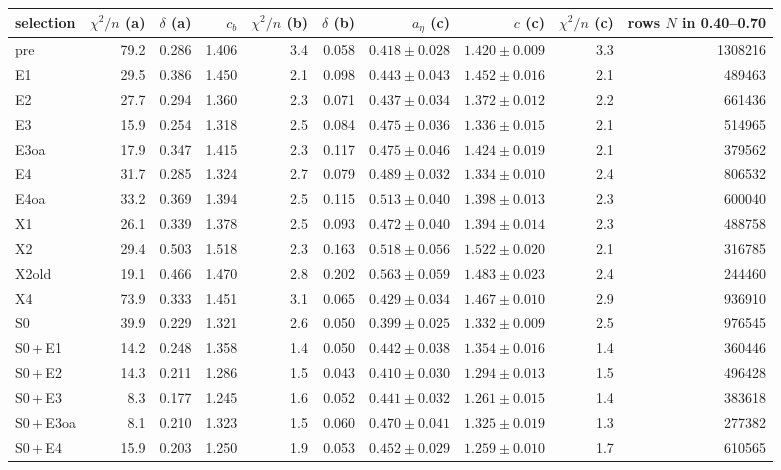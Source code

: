 \begin{tabular}{@{}l r r r r r r r r r@{}}
\toprule
selection & $\chi^2/n$ (a) & $\delta$ (a) & $c_b$ & $\chi^2/n$ (b) & $\delta$ (b) & $a_\eta$ (c) & $c$ (c) & $\chi^2/n$ (c) & rows $N$ in 0.40--0.70 \\
\midrule
pre & 79.2 & 0.286 & 1.406 & 3.4 & 0.058 & $0.418\pm0.028$ & $1.420\pm0.009$ & 3.3 & 1308216 \\
E1 & 29.5 & 0.386 & 1.450 & 2.1 & 0.098 & $0.443\pm0.043$ & $1.452\pm0.016$ & 2.1 & 489463 \\
E2 & 27.7 & 0.294 & 1.360 & 2.3 & 0.071 & $0.437\pm0.034$ & $1.372\pm0.012$ & 2.2 & 661436 \\
E3 & 15.9 & 0.254 & 1.318 & 2.5 & 0.084 & $0.475\pm0.036$ & $1.336\pm0.015$ & 2.1 & 514965 \\
E3oa & 17.9 & 0.347 & 1.415 & 2.3 & 0.117 & $0.475\pm0.046$ & $1.424\pm0.019$ & 2.1 & 379562 \\
E4 & 31.7 & 0.285 & 1.324 & 2.7 & 0.079 & $0.489\pm0.032$ & $1.334\pm0.010$ & 2.4 & 806532 \\
E4oa & 33.2 & 0.369 & 1.394 & 2.5 & 0.115 & $0.513\pm0.040$ & $1.398\pm0.013$ & 2.3 & 600040 \\
X1 & 26.1 & 0.339 & 1.378 & 2.5 & 0.093 & $0.472\pm0.040$ & $1.394\pm0.014$ & 2.3 & 488758 \\
X2 & 29.4 & 0.503 & 1.518 & 2.3 & 0.163 & $0.518\pm0.056$ & $1.522\pm0.020$ & 2.1 & 316785 \\
X2old & 19.1 & 0.466 & 1.470 & 2.8 & 0.202 & $0.563\pm0.059$ & $1.483\pm0.023$ & 2.4 & 244460 \\
X4 & 73.9 & 0.333 & 1.451 & 3.1 & 0.065 & $0.429\pm0.034$ & $1.467\pm0.010$ & 2.9 & 936910 \\
\midrule
S0 & 39.9 & 0.229 & 1.321 & 2.6 & 0.050 & $0.399\pm0.025$ & $1.332\pm0.009$ & 2.5 & 976545 \\
S0\,+\,E1 & 14.2 & 0.248 & 1.358 & 1.4 & 0.050 & $0.442\pm0.038$ & $1.354\pm0.016$ & 1.4 & 360446 \\
S0\,+\,E2 & 14.3 & 0.211 & 1.286 & 1.5 & 0.043 & $0.410\pm0.030$ & $1.294\pm0.013$ & 1.5 & 496428 \\
S0\,+\,E3 & 8.3 & 0.177 & 1.245 & 1.6 & 0.052 & $0.441\pm0.032$ & $1.261\pm0.015$ & 1.4 & 383618 \\
S0\,+\,E3oa & 8.1 & 0.210 & 1.323 & 1.5 & 0.060 & $0.470\pm0.041$ & $1.325\pm0.019$ & 1.3 & 277382 \\
S0\,+\,E4 & 15.9 & 0.203 & 1.250 & 1.9 & 0.053 & $0.452\pm0.029$ & $1.259\pm0.010$ & 1.7 & 610565 \\

\end{tabular}
